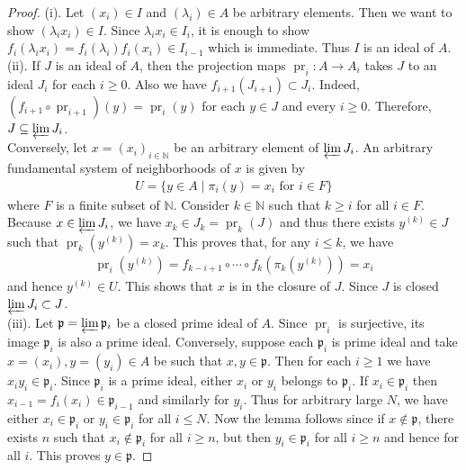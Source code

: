 \documentclass[12pts,a4paper]{amsart}
\DeclareMathOperator{\pr}{pr}
\begin{document}
\begin{proof}
	(i). Let $(x_i)\in I$ and $(\lambda_i)\in A$ be arbitrary elements. Then we want to show $(\lambda_ix_i)\in I$. Since $\lambda_ix_i\in I_i$, it is enough to show $f_i(\lambda_ix_i)=f_i(\lambda_i)f_i(x_i)\in I_{i-1}$ which is immediate. Thus $I$ is an ideal of $A$.\\
    
	(ii). If $J$ is an ideal of $A$, then the projection maps $\pr_i:A\to A_i$ takes $J$ to an ideal $J_i$ for each $i\geq 0$. Also we have $f_{i+1}(J_{i+1})\subset J_i$. Indeed, $(f_{i+1}\circ \pr_{i+1})(y)=\pr_i(y)$ for each $y\in J$ and every $i\geq 0$. Therefore, $J\subseteq \varprojlim J_i$.\\

    Conversely, let $x=(x_i)_{i\in\mathbb{N}}$ be an arbitrary element of $\varprojlim J_i$. An arbitrary fundamental system of neighborhoods of $x$ is given by
    \begin{align*}
        U=\{y\in A\mid \pi_i(y)=x_i\text{ for } i\in F\}
    \end{align*}
    where $F$ is a finite subset of $\mathbb{N}$. Consider $k\in\mathbb{N}$ such that $k\geq i$ for all $i\in F$. Because $x\in\varprojlim J_i$, we have $x_k\in J_k=\pr_k(J)$ and thus there exists $y^{(k)}\in J$ such that $\pr_k(y^{(k)})=x_k$. This proves that, for any $i\leq k$, we have
    \begin{align*}
        \pr_i(y^{(k)})=f_{k-i+1}\circ\cdots\circ f_{k}(\pi_{k}(y^{(k)}))=x_i
    \end{align*}
    and hence $y^{(k)}\in U$. This shows that $x$ is in the closure of $J$. Since $J$ is closed $\varprojlim J_i\subset J$.\\
    
	(iii). Let $\mathfrak{p}=\varprojlim\mathfrak{p}_i$ be a closed prime ideal of $A$. Since $\pr_i$ is surjective, its image $\mathfrak{p}_i$ is also a prime ideal. Conversely, suppose each $\mathfrak{p}_i$ is  prime ideal and take $x=(x_i),y=(y_i)\in A$ be such that $x,y\in\mathfrak{p}$. Then for each $i\geq 1$ we have $x_iy_i\in\mathfrak{p}_i$. Since $\mathfrak{p}_i$ is a prime ideal, either $x_i$ or $y_i$ belongs to $\mathfrak{p}_i$. If $x_i\in\mathfrak{p}_i$ then $x_{i-1}=f_i(x_i)\in\mathfrak{p}_{i-1}$ and similarly for $y_i$. Thus for arbitrary large $N$, we have either $x_i\in\mathfrak{p}_i$ or $y_i\in\mathfrak{p}_i$ for all $i\leq N$. Now the lemma follows since if $x\notin\mathfrak{p}$, there exists $n$ such that $x_i\notin\mathfrak{p}_i$ for all $i\geq n$, but then $y_i\in\mathfrak{p}_i$ for all $i\geq n$ and hence for all $i$. This proves $y\in\mathfrak{p}$.
\end{proof}
\end{document}
